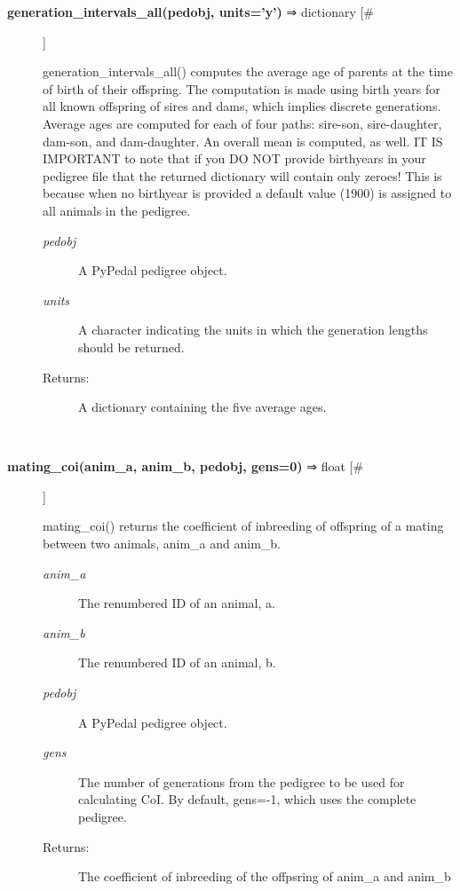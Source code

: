 \documentclass{article}
\begin{document}
\begin{description}
\item[\textbf{generation\_intervals\_all(pedobj, units='y')} ⇒ dictionary [\#]
]
\par generation\_intervals\_all() computes the average age of parents at the time of
birth of their offspring.  The computation is made using birth years for all
known offspring of sires and dams, which implies discrete generations.  Average
ages are computed for each of four paths: sire-son, sire-daughter, dam-son, and
dam-daughter.  An overall mean is computed, as well. IT IS IMPORTANT to note that
if you DO NOT provide birthyears in your pedigree file that the returned dictionary
will contain only zeroes!  This is because when no birthyear is provided a default
value (1900) is assigned to all animals in the pedigree.
\begin{description}
\item[\textit{pedobj}
]
A PyPedal pedigree object.
\item[\textit{units}
]
A character indicating the units in which the generation lengths should be returned.
\item[Returns:
]
A dictionary containing the five average ages.
\end{description}\\

\item[\textbf{mating\_coi(anim\_a, anim\_b, pedobj, gens=0)} ⇒ float [\#]
]
\par mating\_coi() returns the coefficient of inbreeding of offspring of a
mating between two animals, anim\_a and anim\_b.
\begin{description}
\item[\textit{anim\_a}
]
The renumbered ID of an animal, a.
\item[\textit{anim\_b}
]
The renumbered ID of an animal, b.
\item[\textit{pedobj}
]
A PyPedal pedigree object.
\item[\textit{gens}
]
The number of generations from the pedigree to be used for calculating CoI.  By default, gens=-1, which uses the complete pedigree.
\item[Returns:
]
The coefficient of inbreeding of the offpsring of anim\_a and anim\_b
\end{description}\\


\end{description}
\end{document}
